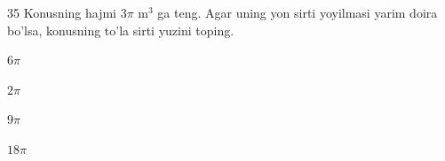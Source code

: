 \documentclass[14pt]{article}
\begin{document}
\begin{questionbox}{35}
    Konusning hajmi \(3\pi\) m\(^3\) ga teng. Agar uning yon sirti yoyilmasi yarim doira bo'lsa, konusning to'la sirti yuzini toping.
    \begin{options}
        \item \(6\pi\)
        \item \(2\pi\)
        \item \(9\pi\)
        \item \(18\pi\)
    \end{options}
\end{questionbox}
\end{document}
